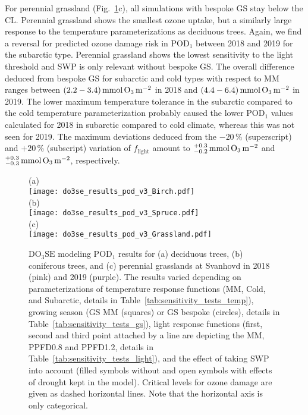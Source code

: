 \documentclass[bg, manuscript]{copernicus}
\begin{document}
For perennial grassland (Fig.~\ref{fig:pody_rel}c), all simulations with bespoke GS stay below the CL. Perennial grassland shows the smallest ozone uptake, but a similarly large response to the temperature parameterizations as deciduous trees. Again, we find a reversal for predicted ozone damage risk in $\mathrm{POD_1}$ between 2018 and 2019 for the subarctic type. Perennial grassland shows the lowest sensitivity to the light threshold and SWP is only relevant without bespoke GS. The overall difference deduced from bespoke GS for subarctic and cold types with respect to MM ranges between $(2.2-3.4)\,\unit{mmol\,\chem{O_3}\,m^{-2}}$ in 2018 and $(4.4-6.4)\,\unit{mmol\,\chem{O_3}\,m^{-2}}$ in 2019. The lower maximum temperature tolerance in the subarctic compared to the cold temperature parameterization probably caused the lower $\mathrm{POD_1}$ values calculated for 2018 in subarctic compared to cold climate, whereas this was not seen for 2019. The maximum deviations deduced from the $-20\,\unit{\%}$ (superscript) and $+20\,\unit{\%}$ (subscript) variation of $f_\mathrm{light}$ amount to $^{+0.3}_{-0.2}\,\unit{mmol\,\chem{O_3}\,m^{-2}}$ and $^{+0.3}_{-0.3}\,\unit{mmol\,\chem{O_3}\,m^{-2}}$, respectively.

\begin{figure}[t]
  \centering
  (a)\\
  \texttt{[image: do3se\_results\_pod\_v3\_Birch.pdf]}\\
  (b)\\
  \texttt{[image: do3se\_results\_pod\_v3\_Spruce.pdf]}\\
  (c)\\
  \texttt{[image: do3se\_results\_pod\_v3\_Grassland.pdf]}
  \caption{$\mathrm{DO_3SE}$ modeling $\mathrm{POD_1}$ results for (a) deciduous trees, (b) coniferous trees, and (c) perennial grasslands at Svanhovd in 2018 (pink) and 2019 (purple). The results varied depending on parameterizations of temperature response functions (MM, Cold, and Subarctic, details in Table~\ref{tab:sensitivity_tests_temp}), growing season (GS MM (squares) or GS bespoke (circles), details in Table~\ref{tab:sensitivity_tests_gs}), light response functions (first, second and third point attached by a line are depicting the MM, PPFD0.8 and PPFD1.2, details in Table~\ref{tab:sensitivity_tests_light}), and the effect of taking SWP into account (filled symbols without and open symbols with effects of drought kept in the model). Critical levels for ozone damage \citep{ICP:MappingManual2017,ESPR:Hayes2021} are given as dashed horizontal lines. Note that the horizontal axis is only categorical.}
  \label{fig:pody_rel}
\end{figure}
\end{document}
